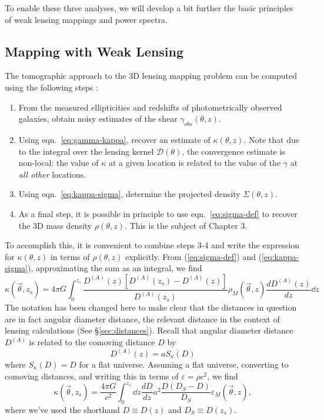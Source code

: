 To enable these three analyses, we will develop a bit further the basic
principles of weak lensing mappings and power spectra.

\subsection{Mapping with Weak Lensing}
\label{sec:lens_mapping_intro}
The tomographic approach to the 3D lensing mapping problem can be
computed using the following steps \citep[see, e.g.][]{Hu02, Simon09,
  Vanderplas2011}:
\begin{enumerate}
  \item From the measured ellipticities and redshifts of photometrically
    observed galaxies, obtain noisy estimates of the shear
    $\gamma_{obs}(\theta, z)$.
  \item Using eqn.~\ref{eq:gamma-kappa}, recover an estimate of
    $\kappa(\theta, z)$.  Note that due to the integral over the lensing
    kernel $\mathcal{D}(\theta)$, the convergence estimate is non-local:
    the value of $\kappa$ at a given location is related to the value of the
    $\gamma$ at {\it all other} locations.
  \item Using eqn.~\ref{eq:kappa-sigma}, determine the projected density
    $\Sigma(\theta, z)$.
  \item As a final step, it is possible in principle to use
    eqn.~\ref{eq:sigma-def} to recover the 3D mass density
    $\rho(\theta, z)$.  This is the subject of Chapter 3.
\end{enumerate}
To accomplish this, it is convenient to combine steps 3-4 and write 
the expression for $\kappa(\theta,z)$ in terms of $\rho(\theta,z)$
explicitly.  From (\ref{eq:sigma-def}) and (\ref{eq:kappa-sigma}),
approximating the sum as an integral, we find
\begin{equation}
  \kappa(\vec{\theta},z_s) 
  = 4\pi G \int_0^{z_s} 
  \frac{D^{(A)}(z)[D^{(A)}(z_s)-D^{(A)}(z)]}{D^{(A)}(z_s)} 
  \rho_M(\vec{\theta},z) \frac{dD^{(A)}(z)}{dz} \dd z
\end{equation}
The notation has been changed here to make clear that the distances in 
question are in fact angular diameter distance, the relevant distance 
in the context of lensing calculations (See \S\ref{sec:distances}).
Recall that angular diameter 
distance $D^{(A)}$ is related to the comoving distance $D$ by
\begin{equation}
  D^{(A)}(z) = a S_\kappa (D)
\end{equation}
where $S_\kappa(D) = D$ for a flat universe.  Assuming a flat universe,
converting to comoving distances, 
and writing this in terms of $\varepsilon = \rho c^2$, we find
\begin{equation}
  \label{kappa-epsilon-1}
  \kappa(\vec{\theta},z_s) 
  = \frac{4\pi G}{c^2} \int_0^{z_s} \dd z\frac{dD}{dz} 
  a^2\frac{D(D_S-D)}{D_S} \varepsilon_M(\vec{\theta},z),
\end{equation}
where we've used the shorthand $D \equiv D(z)$ and 
$D_S \equiv D(z_s)$.

